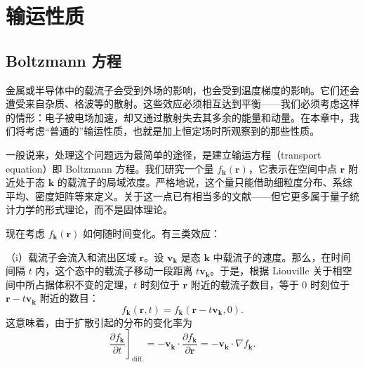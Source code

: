 

\chapter{输运性质}


\section{Boltzmann 方程}

金属或半导体中的载流子会受到外场的影响，也会受到温度梯度的影响。它们还会遭受来自杂质、格波等的散射。这些效应必须相互达到平衡——我们必须考虑这样的情形：电子被电场加速，却又通过散射失去其多余的能量和动量。在本章中，我们将考虑“普通的”输运性质，也就是加上恒定场时所观察到的那些性质。

一般说来，处理这个问题远为最简单的途径，是建立输运方程（transport equation）即 Boltzmann 方程。我们研究一个量 $f_{\mathbf{k}}(\mathbf{r})$，它表示在空间中点 $\mathbf{r}$ 附近处于态 $\mathbf{k}$ 的载流子的局域浓度。严格地说，这个量只能借助细粒度分布、系综平均、密度矩阵等来定义。关于这一点已有相当多的文献——但它更多属于量子统计力学的形式理论，而不是固体理论。

现在考虑 $f_{\mathbf{k}}(\mathbf{r})$ 如何随时间变化。有三类效应：

（i）载流子会流入和流出区域 $\mathbf{r}$。设 $\mathbf{v}_{\mathbf{k}}$ 是态 $\mathbf{k}$ 中载流子的速度。那么，在时间间隔 $t$ 内，这个态中的载流子移动一段距离 $t\mathbf{v}_{\mathbf{k}}$。于是，根据 Liouville 关于相空间中所占据体积不变的定理，$t$ 时刻位于 $\mathbf{r}$ 附近的载流子数目，等于 $0$ 时刻位于 $\mathbf{r}-t\mathbf{v}_{\mathbf{k}}$ 附近的数目：
\begin{equation*}
f_{\mathbf{k}}(\mathbf{r},t)=f_{\mathbf{k}}(\mathbf{r}-t\mathbf{v}_{\mathbf{k}},0).\tag{7.1}
\end{equation*}
这意味着，由于扩散引起的分布的变化率为
\begin{equation*}
\left.\frac{\partial f_{\mathbf{k}}}{\partial t}\right]_{\text{diff.}}
=-\mathbf{v}_{\mathbf{k}}\cdot\frac{\partial f_{\mathbf{k}}}{\partial \mathbf{r}}
=-\mathbf{v}_{\mathbf{k}}\cdot\nabla f_{\mathbf{k}}.\tag{7.2}
\end{equation*}

